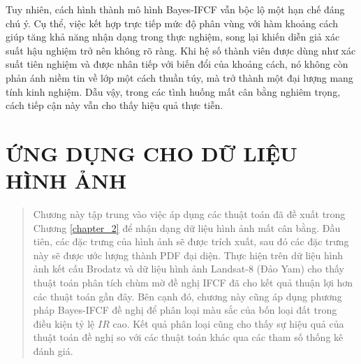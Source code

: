 \documentclass[a4paper,oneside]{book} %
\theoremstyle{plain}
\theoremstyle{plain}
\theoremstyle{nonumberplain}
\begin{document}
Tuy nhiên, cách hình thành mô hình Bayes-IFCF vẫn bộc lộ một hạn chế đáng chú ý. Cụ thể, việc kết hợp trực tiếp mức độ phân vùng với hàm khoảng cách giúp tăng khả năng nhận dạng trong thực nghiệm, song lại khiến diễn giả xác suất hậu nghiệm trở nên không rõ ràng. Khi hệ số thành viên được dùng như xác suất tiên nghiệm và được nhân tiếp với biến đổi của khoảng cách, nó không còn phản ánh niềm tin về lớp một cách thuần túy, mà trở thành một đại lượng mang tính kinh nghiệm. Dẫu vậy, trong các tình huống mất cân bằng nghiêm trọng, cách tiếp cận này vẫn cho thấy hiệu quả thực tiễn.









%
%
%
%







\chapter{ỨNG DỤNG CHO DỮ LIỆU HÌNH ẢNH}\label{chapter_3}


\begin{quotation}\fontsize{12pt}{14pt}\selectfont
	Chương này tập trung vào việc áp dụng các thuật toán đã đề xuất trong Chương \ref{chapter_2}
	để nhận dạng dữ liệu hình ảnh mất cân bằng. Đầu tiên, các đặc trưng của hình ảnh sẽ được
	trích xuất, sau đó các đặc trưng này sẽ được ước lượng thành PDF đại diện.
	Thực hiện trên dữ liệu hình ảnh kết cấu Brodatz và dữ liệu hình ảnh Landsat-8 (Đảo Yam)
	cho thấy thuật toán phân tích chùm mờ đề nghị IFCF đã cho kết quả thuận lợi hơn các
	thuật toán gần đây. Bên cạnh đó, chương này cũng áp dụng phương pháp
	Bayes-IFCF đề nghị để phân loại màu sắc của bốn loại đất trong điều kiện tỷ lệ $IR$ cao.
	Kết quả phân loại cũng cho thấy sự hiệu quả của thuật toán đề nghị so với các thuật toán
	khác qua các tham số thống kê đánh giá.
\end{quotation}
\end{document}
